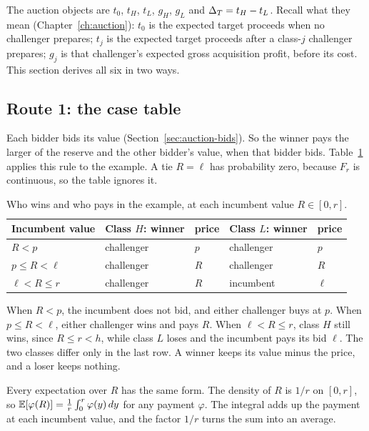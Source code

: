 The auction objects are \(t_0\), \(t_H\), \(t_L\), \(g_H\), \(g_L\) and \(\Delta_T=t_H-t_L\). Recall what they mean
(Chapter~\ref{ch:auction}): \(t_0\) is the expected target proceeds when no challenger prepares; \(t_j\) is the
expected target proceeds after a class-\(j\) challenger prepares; \(g_j\) is that challenger's expected gross
acquisition profit, before its cost. This section derives all six in two ways.

\subsection{Route 1: the case table}

Each bidder bids its value (Section~\ref{sec:auction-bids}). So the winner pays the larger of the reserve and the
other bidder's value, when that bidder bids. Table~\ref{tab:example-cases} applies this rule to the example. A tie
\(R=\ell\) has probability zero, because \(F_r\) is continuous, so the table ignores it.

\begin{table}[htbp]
\centering\small
\caption{Who wins and who pays in the example, at each incumbent value \(R\in[0,r]\).}
\label{tab:example-cases}
\begin{tabular}{@{}lllll@{}}
\toprule
Incumbent value & Class \(H\): winner & price & Class \(L\): winner & price\\
\midrule
\(R<p\) & challenger & \(p\) & challenger & \(p\)\\
\(p\le R<\ell\) & challenger & \(R\) & challenger & \(R\)\\
\(\ell<R\le r\) & challenger & \(R\) & incumbent & \(\ell\)\\
\bottomrule
\end{tabular}
\end{table}

When \(R<p\), the incumbent does not bid, and either challenger buys at \(p\). When \(p\le R<\ell\), either
challenger wins and pays \(R\). When \(\ell<R\le r\), class \(H\) still wins, since \(R\le r<h\), while class \(L\)
loses and the incumbent pays its bid \(\ell\). The two classes differ only in the last row. A winner keeps its
value minus the price, and a loser keeps nothing.

Every expectation over \(R\) has the same form. The density of \(R\) is \(1/r\) on \([0,r]\), so
\(\mathbb{E}[\varphi(R)]=\frac1r\int_0^r\varphi(y)\,dy\) for any payment \(\varphi\). The integral adds up the payment at
each incumbent value, and the factor \(1/r\) turns the sum into an average.

